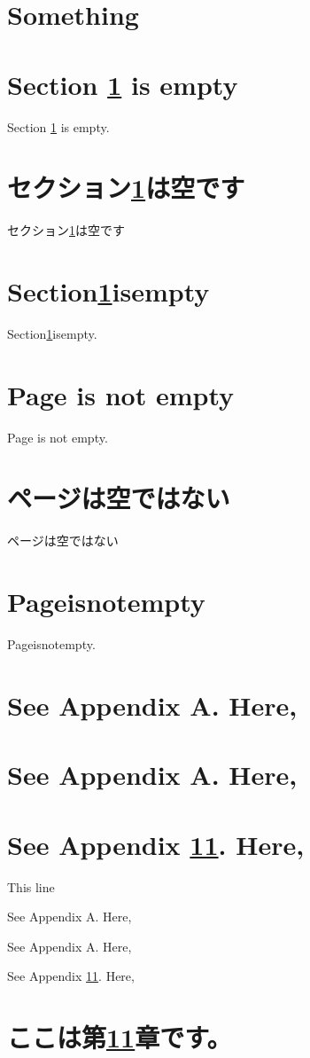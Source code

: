 \documentclass[twocolumn]{article}
\begin{document}

\tableofcontents\newpage
\section{Something}\label{a}
\section{Section \ref{a} is empty}
Section \ref{a} is empty.
\section{セクション\ref{a}は空です}
セクション\ref{a}は空です
\section{Section\ref{a}isempty}
Section\ref{a}isempty.
\section{Page \pageref{a} is not empty}
Page \pageref{a} is not empty.
\section{ページ\pageref{a}は空ではない}
ページ\pageref{a}は空ではない
\section{Page\pageref{a}isnotempty}
Page\pageref{a}isnotempty.

\setcounter{section}{10}
\section{See Appendix A. Here,}
\section{See Appendix A\@. Here,}
\section{See Appendix \ref{testA}. Here,}
This line\par
See Appendix A. Here,\par
See Appendix A\@. Here,\par
See Appendix \ref{testA}. Here,\par
\appendix
\section{ここは第\ref{testA}章です。}\label{testA}
\end{document}

